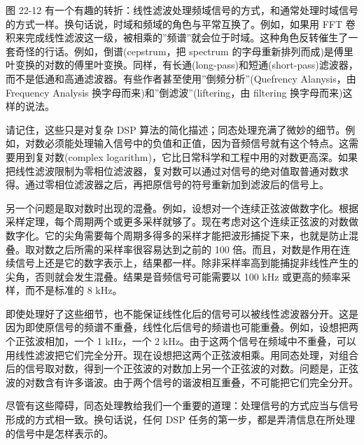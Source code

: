 图 22-12
有一个有趣的转折：线性滤波处理频域信号的方式，和通常处理时域信号的方式一样。换句话说，时域和频域的角色与平常互换了。例如，如果用
FFT
卷积来完成线性滤波这一级，被相乘的''频谱''就会位于时域。这种角色反转催生了一套奇怪的行话。例如，倒谱(cepstrum，把
spectrum
的字母重新排列而成)是傅里叶变换的对数的傅里叶变换。同样，有长通(long-pass)和短通(short-pass)滤波器，而不是低通和高通滤波器。有些作者甚至使用''倒频分析''(Quefrency
Alanysis，由 Frequency Analysis 换字母而来)和''倒滤波''(liftering，由
filtering 换字母而来)这样的说法。

请记住，这些只是对复杂 DSP
算法的简化描述；同态处理充满了微妙的细节。例如，对数必须能处理输入信号中的负值和正值，因为音频信号就有这个特点。这需要用到复对数(complex
logarithm)，它比日常科学和工程中用的对数更高深。如果把线性滤波限制为零相位滤波器，复对数可以通过对信号的绝对值取普通对数求得。通过零相位滤波器之后，再把原信号的符号重新加到滤波后的信号上。

另一个问题是取对数时出现的混叠。例如，设想对一个连续正弦波做数字化。根据采样定理，每个周期两个或更多采样就够了。现在考虑对这个连续正弦波的对数做数字化。它的尖角需要每个周期多得多的采样才能把波形捕捉下来，也就是防止混叠。取对数之后所需的采样率很容易达到之前的
100
倍。而且，对数是作用在连续信号上还是它的数字表示上，结果都一样。除非采样率高到能捕捉非线性产生的尖角，否则就会发生混叠。结果是音频信号可能需要以
100 kHz 或更高的频率采样，而不是标准的 8 kHz。

即使处理好了这些细节，也不能保证线性化后的信号可以被线性滤波器分开。这是因为即使原信号的频谱不重叠，线性化后信号的频谱也可能重叠。例如，设想把两个正弦波相加，一个
1 kHz，一个 2
kHz。由于这两个信号在频域中不重叠，可以用线性滤波把它们完全分开。现在设想把这两个正弦波相乘。用同态处理，对组合后的信号取对数，得到一个正弦波的对数加上另一个正弦波的对数。问题是，正弦波的对数含有许多谐波。由于两个信号的谐波相互重叠，不可能把它们完全分开。

尽管有这些障碍，同态处理教给我们一个重要的道理：处理信号的方式应当与信号形成的方式相一致。换句话说，任何
DSP 任务的第一步，都是弄清信息在所处理的信号中是怎样表示的。
